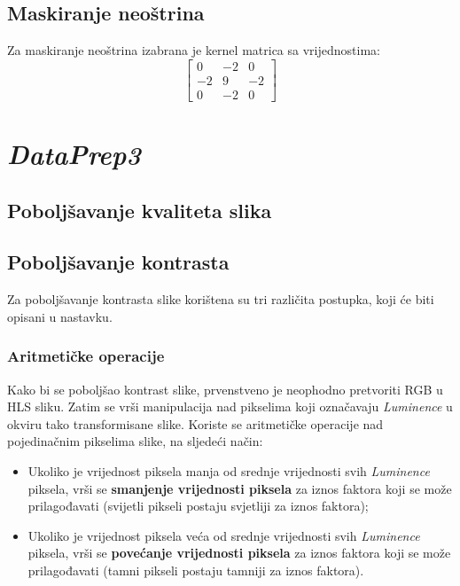 \documentclass[12pt,a4paper]{article}
\begin{document}
\subsection{Maskiranje neoštrina}

Za maskiranje neoštrina izabrana je kernel matrica sa vrijednostima:
\[
\begin{bmatrix}
    0 & -2 & 0 \\
    -2 & 9 & -2 \\
    0 & -2 & 0
\end{bmatrix}
\]

\newpage

\section{\textit{DataPrep3}}

\subsection{Poboljšavanje kvaliteta slika}

\subsection{Poboljšavanje kontrasta}

Za poboljšavanje kontrasta slike korištena su tri različita postupka, koji će biti opisani u nastavku.

\subsubsection{Aritmetičke operacije}

Kako bi se poboljšao kontrast slike, prvenstveno je neophodno pretvoriti RGB u HLS sliku. Zatim se vrši manipulacija nad pikselima koji označavaju \textit{Luminence} u okviru tako transformisane slike. Koriste se aritmetičke operacije nad pojedinačnim pikselima slike, na sljedeći način:

\begin{itemize}

\item Ukoliko je vrijednost piksela manja od srednje vrijednosti svih \textit{Luminence} piksela, vrši se \textbf{smanjenje vrijednosti piksela} za iznos faktora koji se može prilagođavati (svijetli pikseli postaju svjetliji za iznos faktora);
\item Ukoliko je vrijednost piksela veća od srednje vrijednosti svih \textit{Luminence} piksela, vrši se \textbf{povećanje vrijednosti piksela} za iznos faktora koji se može prilagođavati (tamni pikseli postaju tamniji za iznos faktora).

\end{itemize}
\end{document}
